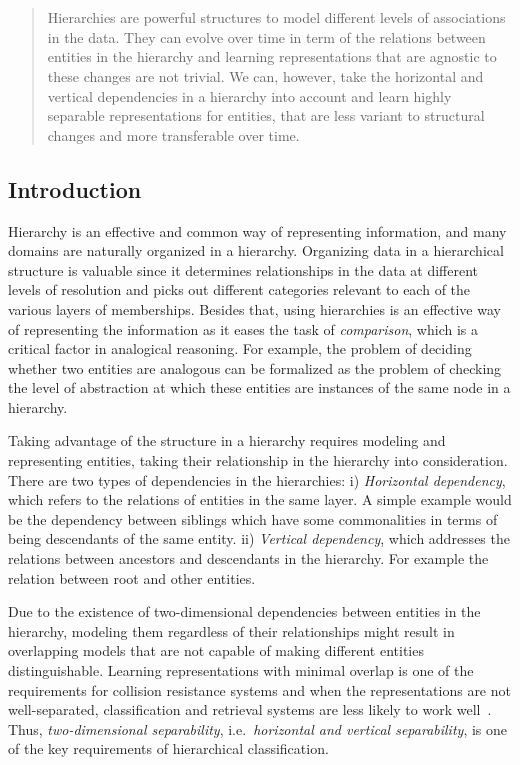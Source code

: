 \chapter{}
\label{chap:3}
%
\begin{quote}
Hierarchies are powerful structures to model different levels of associations in the data. They can evolve over time in term of the relations between entities in the hierarchy and learning representations that are agnostic to these changes are not trivial. We can, however, take the horizontal and vertical dependencies in a hierarchy into account and learn highly separable representations for entities, that are less variant to structural changes and more transferable over time. 
\end{quote}
%
\section{Introduction}
Hierarchy is an effective and common way of representing information, and many domains are naturally organized in a hierarchy. Organizing data in a hierarchical structure is valuable since it determines relationships in the data at different levels of resolution and picks out different categories relevant to each of the various layers of memberships.  
Besides that, using hierarchies is an effective way of representing the information as it eases the task of \emph{comparison}, which is a critical factor in analogical reasoning. For example, the problem of deciding whether two entities are analogous can be formalized as the problem of checking the level of abstraction at which these entities are instances of the same node in a hierarchy.

Taking advantage of the structure in a hierarchy requires modeling and representing entities, taking their relationship in the hierarchy into consideration. 
There are two types of dependencies in the hierarchies: i) \emph{Horizontal dependency}, which refers to the relations of entities in the same layer.  A simple example would be the dependency between siblings which have some commonalities in terms of being descendants of the same entity. ii) \emph{Vertical dependency}, which addresses the relations between ancestors and descendants in the hierarchy. For example the relation between root and other entities. 

Due to the existence of two-dimensional dependencies between entities in the hierarchy, modeling them regardless of their relationships might result in overlapping models that are not capable of making different entities distinguishable.  Learning representations with minimal overlap is one of the requirements for collision resistance systems and when the representations are not well-separated, classification and retrieval systems are less likely to work well~\citep{Lewis:1992}. 
Thus, \emph{two-dimensional separability}, i.e.\ \emph{horizontal and vertical separability}, is one of the key requirements of hierarchical classification.

